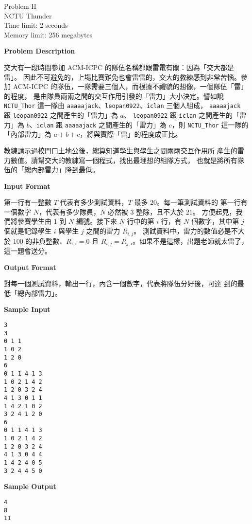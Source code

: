 \documentclass[11pt]{article}
\begin{document}
\begin{center}
    {\LARGE Problem H}\\
    {\Large NCTU Thunder}\\
    {Time limit: 2 seconds}\\
    {Memory limit: 256 megabytes}
\end{center}

\textbf{\large Problem Description}

交⼤有一段時間參加 ACM-ICPC 的隊伍名稱都跟雷電有關：因為「交⼤都是雷」。
因此不可避免的，上場⽐賽難免也會雷雷的，交⼤的教練感到⾮常苦惱。參加 
ACM-ICPC 的隊伍，⼀隊需要三個⼈，⽽根據不禮貌的想像，⼀個隊伍「雷」的程度，
是由隊員兩兩之間的交互作⽤引發的「雷⼒」⼤⼩決定。譬如說 \verb+NCTU_Thor+ 
這⼀隊由 \verb+aaaaajack+、\verb+leopan0922+、\verb+iclan+ 三個⼈組成，
\verb+aaaaajack+ 跟 \verb+leopan0922+ 之間產⽣的「雷⼒」為 $a$、
\verb+leopan0922+ 跟 \verb+iclan+ 之間產⽣的「雷⼒」為 $b$、\verb+iclan+ 跟
\verb+aaaaajack+ 之間產⽣的「雷⼒」為 $c$，則 \verb+NCTU_Thor+ 這⼀隊的
「內部雷⼒」為 $a + b + c$，將與實際「雷」的程度成正⽐。

教練請⽰過校⾨⼝⼟地公後，總算知道學⽣與學⽣之間兩兩交互作⽤所
產⽣的雷⼒數值。請幫交⼤的教練寫⼀個程式，找出最理想的組隊⽅式，
也就是將所有隊伍的「總內部雷⼒」降到最低。

\textbf{\large Input Format}

第⼀⾏有⼀整數 $T$ 代表有多少測試資料，$T$ 最多 $20$。每⼀筆測試資料的
第⼀⾏有⼀個數字 $N$，代表有多少隊員，$N$ 必然被 $3$ 整除，且不⼤於 $21$。
⽅便起⾒，我們將參賽學⽣由 $1$ 到 $N$ 編號。接下來 $N$ ⾏中的第 $i$ ⾏，有
$N$ 個數字，其中第 $j$ 個就是記錄學⽣ $i$ 與學⽣ $j$ 之間的雷⼒ $R_{i,j}$。
測試資料中，雷⼒的數值必是不⼤於 $100$ 的⾮負整數、$R_{i,i} = 0$ 
且 $R_{i,j} = R_{j,i}$。如果不是這樣，出題⽼師就太雷了，這⼀題會送分。

\textbf{\large Output Format}

對每⼀個測試資料，輸出⼀⾏，內含⼀個數字，代表將隊伍分好後，可達
到的最低「總內部雷⼒」。

\textbf{\large Sample Input}

\begin{verbatim}
3
3
0 1 1
1 0 2
1 2 0
6
0 1 1 4 1 3
1 0 2 1 4 2
1 2 0 3 2 4
4 1 3 0 1 1
1 4 2 1 0 2
3 2 4 1 2 0
6
0 1 1 4 1 3
1 0 2 1 4 2
1 2 0 3 2 4
4 1 3 0 4 4
1 4 2 4 0 5
3 2 4 4 5 0
\end{verbatim}

\textbf{\large Sample Output}
\begin{verbatim}
4
8
11
\end{verbatim}
\end{document}
